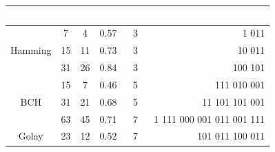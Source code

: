 
\begin{center}
\renewcommand{\arraystretch}{1.5} %
\begin{tabular}{|c|c|c|c|c|r|}
    \hline
    \rowcolor{headergreen} 
    \textcolor{white}{\textbf{Codice}} & 
    \textcolor{white}{\textbf{$n$}} & 
    \textcolor{white}{\textbf{$k$}} & 
    \textcolor{white}{\textbf{$R_c$}} & 
    \textcolor{white}{\textbf{$d_{min}$}} & 
    \textcolor{white}{\textbf{$G(p)$}} \\ \hline
    
    \multirow{3}{*}{Hamming} & 7  & 4  & 0.57 & 3 & 1 011 \\ \cline{2-6}
                             & 15 & 11 & 0.73 & 3 & 10 011 \\ \cline{2-6}
                             & 31 & 26 & 0.84 & 3 & 100 101 \\ \hline
                             
    \multirow{3}{*}{BCH}     & 15 & 7  & 0.46 & 5 & 111 010 001 \\ \cline{2-6}
                             & 31 & 21 & 0.68 & 5 & 11 101 101 001 \\ \cline{2-6}
                             & 63 & 45 & 0.71 & 7 & 1 111 000 001 011 001 111 \\ \hline
                             
    Golay                    & 23 & 12 & 0.52 & 7 & 101 011 100 011 \\ \hline
\end{tabular}
\end{center}